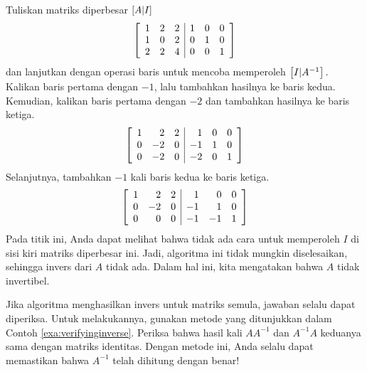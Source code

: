 \begin{solution} Tuliskan matriks diperbesar $\left[ A|I\right] $
\begin{equation*}
\left[
\begin{array}{rrr|rrr}
1 & 2 & 2 & 1 & 0 & 0 \\
1 & 0 & 2 & 0 & 1 & 0 \\
2 & 2 & 4 & 0 & 0 & 1
\end{array}
\right]
\end{equation*}
dan lanjutkan dengan operasi baris untuk mencoba memperoleh $\left[
I|A^{-1}\right] .$ Kalikan baris pertama dengan $-1$, lalu tambahkan hasilnya ke
baris kedua. Kemudian, kalikan baris pertama dengan $ -2 $ dan tambahkan hasilnya ke
baris ketiga.
\begin{equation*}
\left[ 
\begin{array}{rrr|rrr}
1 & 2 & 2 & 1 & 0 & 0 \\
0 & -2 & 0 & -1 & 1 & 0 \\
0 & -2 & 0 & -2 & 0 & 1
\end{array}
\right]
\end{equation*}
Selanjutnya, tambahkan $-1 $ kali baris kedua ke baris ketiga.
\begin{equation*}
\left[ 
\begin{array}{rrr|rrr}
1 & 2 & 2 & 1 & 0 & 0 \\
0 & -2 & 0 & -1 & 1 & 0 \\
0 & 0 & 0 & -1 & -1 & 1
\end{array}
\right]
\end{equation*}
Pada titik ini, Anda dapat melihat bahwa tidak ada cara untuk memperoleh $I$ di
sisi kiri matriks diperbesar ini. Jadi, algoritma ini tidak mungkin
diselesaikan, sehingga invers dari $A$ tidak
ada. Dalam hal ini, kita mengatakan bahwa $A$ tidak invertibel.
\end{solution}

Jika algoritma menghasilkan invers untuk matriks semula, jawaban selalu dapat diperiksa.
Untuk melakukannya, gunakan metode yang ditunjukkan dalam Contoh \ref{exa:verifyinginverse}. Periksa bahwa hasil kali $AA^{-1}$ dan $A^{-1}A$ keduanya sama dengan
matriks identitas. Dengan metode ini, Anda selalu dapat memastikan bahwa $A^{-1}$ telah dihitung dengan benar!

